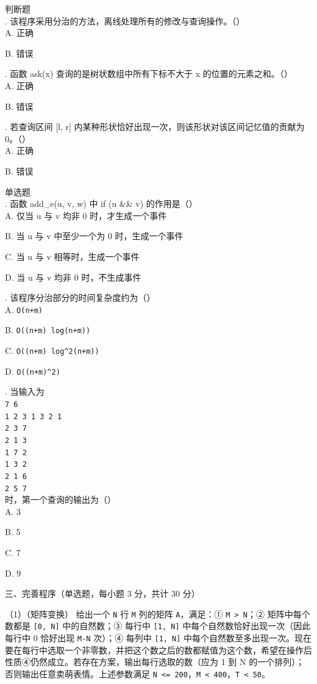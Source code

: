 \documentclass[a4paper]{ctexart}
\newcommand{\wdot}{{\wingdingsfont\fontsize{12}{12}\selectfont\XeTeXglyph122\relax}}
\newcommand{\bigtitle}[1]{\noindent\heiti #1\par\vspace{2pt}}
\newcommand{\q}[1]{\noindent #1}
\newcommand{\opt}[1]{\hspace*{2em} #1\par}
\begin{document}
\noindent\wdot\hspace{0.5em}判断题\\
\q{27.} 该程序采用分治的方法，离线处理所有的修改与查询操作。（\qquad）\\
\opt{A. 正确}
\opt{B. 错误}
\q{28.} 函数 ask(x) 查询的是树状数组中所有下标不大于 x 的位置的元素之和。（\qquad）\\
\opt{A. 正确}
\opt{B. 错误}
\q{29.} 若查询区间 [l, r] 内某种形状恰好出现一次，则该形状对该区间记忆值的贡献为 0。（\qquad）\\
\opt{A. 正确}
\opt{B. 错误}

\noindent\wdot\hspace{0.5em}单选题\\
\q{30.} 函数 add\_e(u, v, w) 中 if (u \&\& v) 的作用是（\qquad）\\
\opt{A. 仅当 u 与 v 均非 0 时，才生成一个事件}
\opt{B. 当 u 与 v 中至少一个为 0 时，生成一个事件}
\opt{C. 当 u 与 v 相等时，生成一个事件}
\opt{D. 当 u 与 v 均非 0 时，不生成事件}
\q{31.} 该程序分治部分的时间复杂度约为（\qquad）\\
\opt{A. \texttt{O(n+m)}}
\opt{B. \texttt{O((n+m) log(n+m))}}
\opt{C. \texttt{O((n+m) log\^{}2(n+m))}}
\opt{D. \texttt{O((n+m)\^{}2)}}
\q{32.} 当输入为\\
\hspace*{2em} \texttt{7 6}\\
\hspace*{2em} \texttt{1 2 3 1 3 2 1}\\
\hspace*{2em} \texttt{2 3 7}\\
\hspace*{2em} \texttt{2 1 3}\\
\hspace*{2em} \texttt{1 7 2}\\
\hspace*{2em} \texttt{1 3 2}\\
\hspace*{2em} \texttt{2 1 6}\\
\hspace*{2em} \texttt{2 5 7}\\
\hspace*{1em} 时，第一个查询的输出为（\qquad）\\
\opt{A. 3}
\opt{B. 5}
\opt{C. 7}
\opt{D. 9}

\clearpage
\bigtitle{三、完善程序（单选题，每小题 3 分，共计 30 分）}

\noindent（1）（矩阵变换） 给出一个 \texttt{N} 行 \texttt{M} 列的矩阵 \texttt{A}，满足：① \texttt{M > N}；② 矩阵中每个数都是 \texttt{[0, N]} 中的自然数；③ 每行中 \texttt{[1, N]} 中每个自然数恰好出现一次（因此每行中 0 恰好出现 \texttt{M-N} 次）；④ 每列中 \texttt{[1, N]} 中每个自然数至多出现一次。现在要在每行中选取一个非零数，并把这个数之后的数都赋值为这个数，希望在操作后性质④仍然成立。若存在方案，输出每行选取的数（应为 1 到 N 的一个排列）；否则输出任意卖萌表情。上述参数满足 \texttt{N <= 200}，\texttt{M < 400}，\texttt{T < 50}。\\
\end{document}
